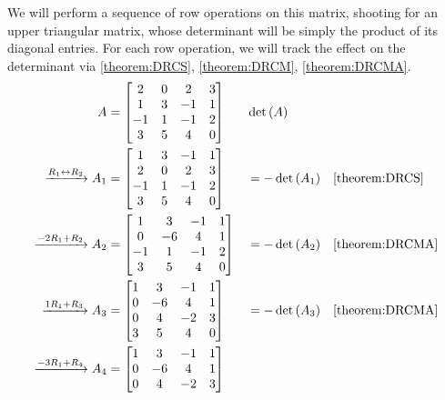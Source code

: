 \documentclass{ximera}
\begin{document}
\begin{example}
  We will perform a sequence of row operations on this matrix,
  shooting for an upper triangular matrix, whose determinant will be
  simply the product of its diagonal entries.  For each row operation,
  we will track the effect on the determinant via \ref{theorem:DRCS},
  \ref{theorem:DRCM}, \ref{theorem:DRCMA}.
  \begin{align*}
    A&=
       \begin{bmatrix}
         2 & 0 & 2 & 3 \\
         1 & 3 &-1 & 1 \\
         -1& 1 &-1 & 2 \\
         3 & 5 & 4 & 0
       \end{bmatrix}
                   &&\det\left(A\right)&&\\
    \xrightarrow{R_{1}\leftrightarrow R_{2}}
    A_1&=
         \begin{bmatrix}
           1 & 3 &-1 & 1 \\
           2 & 0 & 2 & 3 \\
           -1& 1 &-1 & 2 \\
           3 & 5 & 4 & 0
         \end{bmatrix}
                   &
           &=-\det\left(A_1\right)&&\ref{theorem:DRCS}\\
    \xrightarrow{-2R_{1}+R_{2}}
    A_2&=
         \begin{bmatrix}
           1 & 3 &-1 & 1 \\
           0 &-6 & 4 & 1 \\
           -1& 1 &-1 & 2 \\
           3 & 5 & 4 & 0
         \end{bmatrix}
                   &
           &=-\det\left(A_2\right)&&\ref{theorem:DRCMA}\\
    \xrightarrow{1R_{1}+R_{3}}
    A_3&=
         \begin{bmatrix}
           1 & 3 &-1 & 1 \\
           0 &-6 & 4 & 1 \\
           0 & 4 &-2 & 3 \\
           3 & 5 & 4 & 0
         \end{bmatrix}
                   &
           &=-\det\left(A_3\right)&&\ref{theorem:DRCMA}\\
    \xrightarrow{-3R_{1}+R_{4}}
    A_4&=
         \begin{bmatrix}
           1 & 3 &-1 & 1 \\
           0 &-6 & 4 & 1 \\
           0 & 4 &-2 & 3 \\

\end{bmatrix}
\end{align*}
\end{example}
\end{document}
